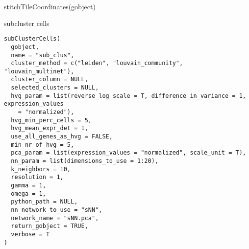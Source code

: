 \documentclass[a4paper]{book}
\begin{document}
%
\begin{Examples}
\begin{ExampleCode}
    stitchTileCoordinates(gobject)
\end{ExampleCode}
\end{Examples}
%
\begin{Description}\relax
subcluster cells
\end{Description}
%
\begin{Usage}
\begin{verbatim}
subClusterCells(
  gobject,
  name = "sub_clus",
  cluster_method = c("leiden", "louvain_community", "louvain_multinet"),
  cluster_column = NULL,
  selected_clusters = NULL,
  hvg_param = list(reverse_log_scale = T, difference_in_variance = 1, expression_values
    = "normalized"),
  hvg_min_perc_cells = 5,
  hvg_mean_expr_det = 1,
  use_all_genes_as_hvg = FALSE,
  min_nr_of_hvg = 5,
  pca_param = list(expression_values = "normalized", scale_unit = T),
  nn_param = list(dimensions_to_use = 1:20),
  k_neighbors = 10,
  resolution = 1,
  gamma = 1,
  omega = 1,
  python_path = NULL,
  nn_network_to_use = "sNN",
  network_name = "sNN.pca",
  return_gobject = TRUE,
  verbose = T
)
\end{verbatim}
\end{Usage}
%
\end{document}
